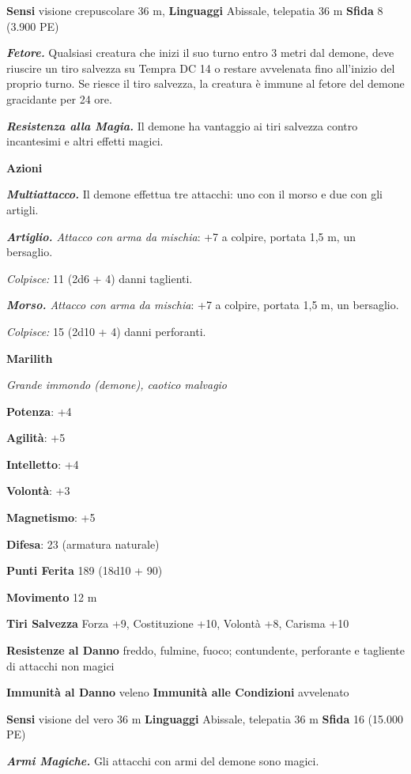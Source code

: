 \begin{multicols}{2}
\textbf{Sensi} visione crepuscolare 36 m, 
\textbf{Linguaggi} Abissale, telepatia 36 m \textbf{Sfida} 8 (3.900 PE)

\emph{\textbf{Fetore.}} Qualsiasi creatura che inizi il suo turno entro
3 metri dal demone, deve riuscire un tiro salvezza su Tempra DC 14
o restare avvelenata fino all'inizio del proprio turno. Se riesce il
tiro salvezza, la creatura è immune al fetore del demone gracidante per
24 ore.

\emph{\textbf{Resistenza alla Magia.}} Il demone ha vantaggio ai tiri
salvezza contro incantesimi e altri effetti magici.

\textbf{Azioni}

\emph{\textbf{Multiattacco.}} Il demone effettua tre attacchi: uno con
il morso e due con gli artigli.

\emph{\textbf{Artiglio.} Attacco con arma da mischia}: +7 a colpire,
portata 1,5 m, un bersaglio.

\emph{Colpisce:} 11 (2d6 + 4) danni taglienti.

\emph{\textbf{Morso.} Attacco con arma da mischia}: +7 a colpire,
portata 1,5 m, un bersaglio.

\emph{Colpisce:} 15 (2d10 + 4) danni perforanti.

\textbf{Marilith}

\emph{Grande immondo (demone), caotico malvagio}

\textbf{Potenza}: +4

\textbf{Agilità}: +5

\textbf{Intelletto}: +4

\textbf{Volontà}: +3

\textbf{Magnetismo}: +5

\textbf{Difesa}: 23 (armatura naturale)

\textbf{Punti Ferita} 189 (18d10 + 90)

\textbf{Movimento} 12 m

\textbf{Tiri Salvezza} Forza +9, Costituzione +10, Volontà +8, Carisma
+10

\textbf{Resistenze al Danno} freddo, fulmine, fuoco; contundente,
perforante e tagliente di attacchi non magici

\textbf{Immunità al Danno} veleno \textbf{Immunità alle Condizioni}
avvelenato

\textbf{Sensi} visione del vero 36 m
\textbf{Linguaggi} Abissale, telepatia 36 m \textbf{Sfida} 16 (15.000
PE)

\emph{\textbf{Armi Magiche.}} Gli attacchi con armi del demone sono
magici.


\end{multicols}
